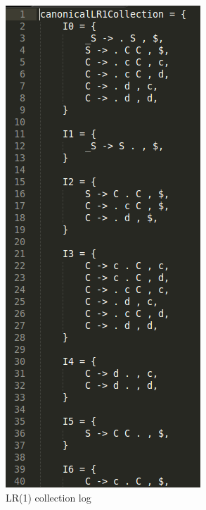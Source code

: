 \documentclass{beamer}
\begin{document}
\begin{frame}
\begin{figure}
    \centering
    \begin{subfigure}[b]{0.3\textwidth}
        \includegraphics[height=0.8\textheight]{LogLR1Collection.png}
        \caption{LR(1) collection log}
        \label{fig:lr1collection}
    \end{subfigure}
    ~ %
    \begin{subfigure}[b]{0.3\textwidth}

\end{subfigure}
\end{figure}
\end{frame}
\end{document}

